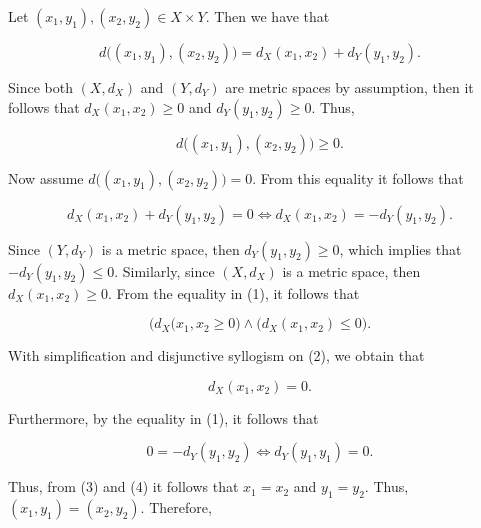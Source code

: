 \documentclass{article}
\makeatletter
\theoremstyle{definition}
\theoremstyle{remark}
\let\oldproofname=\proofname
\renewcommand{\proofname}{\bf{\textit{\oldproofname}}}
\theoremstyle{definition}
\renewenvironment{proof}[1][\proofname]{\par
  \pushQED{\qed}%
  \normalfont \topsep6\p@\@plus6\p@\relax
  \list{}{\leftmargin=0mm
          \rightmargin=0mm
          \settowidth{\itemindent}{\itshape#1}%
          \labelwidth=\itemindent
          \parsep=0pt \listparindent=0mm%
  }
  \item[\hskip\labelsep
        \itshape
    #1\@addpunct{.}]\ignorespaces
}{%
  \popQED\endlist\@endpefalse
}
\makeatother
\begin{document}
    \begin{proof}
        Let $(x_1,y_1),(x_2,y_2)\in X\times Y$. Then we have that 
        
        \begin{equation*}
            d\big((x_1,y_1),(x_2,y_2)\big)=d_X(x_1,x_2)+d_Y(y_1,y_2).
        \end{equation*}
        
        Since both $(X,d_X)$ and $(Y,d_Y)$ are metric spaces by assumption, then it follows that $d_X(x_1,x_2)\geq 0$ and $d_Y(y_1,y_2)\geq 0$. Thus,
        
        \begin{equation}
        \label{eq:1.1}
            d\big((x_1,y_1),(x_2,y_2)\big)\geq 0.
        \end{equation}
        
        Now assume $d\big((x_1,y_1),(x_2,y_2)\big)=0$. From this equality it follows that 
        
        \begin{equation}
        \label{eq:1.2}
            d_X(x_1,x_2)+d_Y(y_1,y_2)=0\Leftrightarrow d_X(x_1,x_2)=-d_Y(y_1,y_2).
        \end{equation}
        
        \noindent Since $(Y,d_Y)$ is a metric space, then $d_Y(y_1,y_2)\geq 0$, which implies that $-d_Y(y_1,y_2)\leq 0$. Similarly, since $(X,d_X)$ is a metric space, then $d_X(x_1,x_2)\geq 0$. From the equality in (1), it follows that 
        
        \begin{equation}
            \big(d_X(x_1,x_2\geq 0\big)\wedge\big(d_X(x_1,x_2)\leq 0\big).
        \end{equation}
        
        \noindent With simplification and disjunctive syllogism on (2), we obtain that
        
        \begin{equation}
            d_X(x_1,x_2)=0.
        \end{equation}
        
        \noindent Furthermore, by the equality in (1), it follows that 
        
        \begin{equation}
            0=-d_Y(y_1,y_2)\Leftrightarrow d_Y(y_1,y_1)=0.
        \end{equation}
        
        \noindent Thus, from (3) and (4) it follows that $x_1=x_2$ and $y_1=y_2$. Thus, $(x_1,y_1)=(x_2,y_2)$. Therefore,
        

\end{proof}
\end{document}

